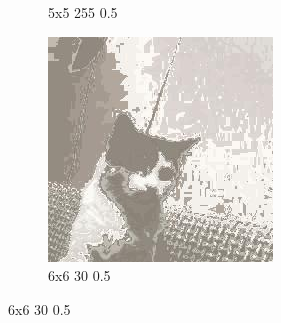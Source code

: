 \documentclass[12pt,a4paper]{article}
\begin{document}
\begin{figure}[H]
\begin{subfigure}{0.25\textwidth}
  \caption{5x5 255 0.5}
  \label{fig:5}
\end{subfigure}\hfil %
\begin{subfigure}{0.25\textwidth}
  \includegraphics[width=\linewidth]{images/small/6-6-30-05}
  \caption{6x6 30 0.5}
  \label{fig:6}
\end{subfigure}


\end{figure}
\end{document}
